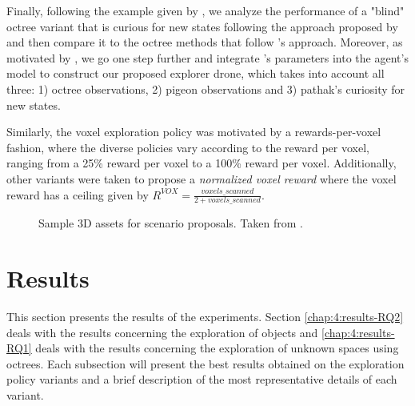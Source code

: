 Finally, following the example given by \textcite{chaplot2020semantic}, we analyze the performance of a "blind" octree variant that is curious for new states following the approach proposed by  \textcite{pathak2017curiosity} and then compare it to the octree methods that follow \textcite{chen2019learning}'s approach. Moreover, as motivated by \textcite{github-unity-mlagents-toolkit}, we go one step further and integrate \textcite{pathak2017curiosity}'s parameters into the agent's model to construct our proposed explorer drone, which takes into account all three: 1) octree observations, 2) pigeon observations and 3) pathak's curiosity for new states.


Similarly, the voxel exploration policy was motivated by a rewards-per-voxel fashion, where the diverse policies vary according to the reward per voxel, ranging from a 25\% reward per voxel to a 100\% reward per voxel. Additionally, other variants were taken to propose a \textit{normalized voxel reward} where the voxel reward has a ceiling given by $ R^{VOX} = \frac{voxels\_scanned}{2 + voxels\_scanned} $.

\begin{figure}[!ht]
    \centering
    \caption{Sample 3D assets for scenario proposals. Taken from \cite{unity-asset-store}.}
    \label{fig:unity-my-3d-envs}
\end{figure}

\section{Results}\label{chap:4:results}
This section presents the results of the experiments. Section \ref{chap:4:results-RQ2} deals with the results concerning the exploration of objects and \ref{chap:4:results-RQ1} deals with the results concerning the exploration of unknown spaces using octrees. Each subsection will present the best results obtained on the exploration policy variants and a brief description of the most representative details of each variant.

